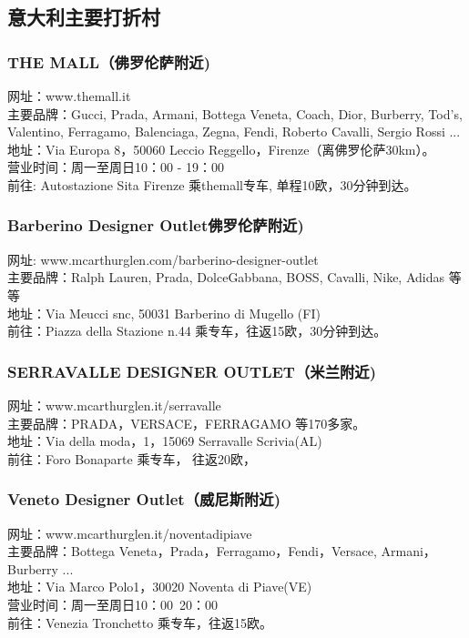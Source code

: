 \begin{itemize}
\begin{itemize}
\section{意大利主要打折村}
\begin{multicols}{2}

\subsubsection{THE MALL（佛罗伦萨附近)}
\noindent 网址：www.themall.it\\
主要品牌：Gucci, Prada, Armani, Bottega Veneta, Coach, Dior, Burberry, Tod’s, Valentino, Ferragamo, Balenciaga, Zegna, Fendi, Roberto Cavalli, Sergio Rossi ...\\
地址：Via Europa 8，50060 Leccio Reggello，Firenze（离佛罗伦萨30km）。\\
营业时间：周一至周日10：00 - 19：00 \\
前往: Autostazione Sita Firenze 乘themall专车, 单程10欧，30分钟到达。

\subsubsection{Barberino Designer Outlet佛罗伦萨附近)}
\noindent 网址: www.mcarthurglen.com/barberino-designer-outlet\\
主要品牌：Ralph Lauren, Prada, DolceGabbana, BOSS, Cavalli, Nike, Adidas 等等\\
地址：Via Meucci snc, 50031 Barberino di Mugello (FI)\\
前往：Piazza della Stazione n.44 乘专车，往返15欧，30分钟到达。
 
\subsubsection{SERRAVALLE DESIGNER OUTLET（米兰附近)}
\noindent 网址：www.mcarthurglen.it/serravalle\\
主要品牌：PRADA，VERSACE，FERRAGAMO 等170多家。\\
地址：Via della moda，1，15069 Serravalle Scrivia(AL)\\
前往：Foro Bonaparte 乘专车， 往返20欧，
 
\subsubsection{Veneto Designer Outlet（威尼斯附近)}
\noindent 网址：www.mcarthurglen.it/noventadipiave \\
主要品牌：Bottega Veneta，Prada，Ferragamo，Fendi，Versace, Armani，Burberry ... \\
地址：Via Marco Polo1，30020 Noventa di Piave(VE) \\
营业时间：周一至周日10：00~20：00\\
前往：Venezia Tronchetto 乘专车，往返15欧。
 

\end{multicols}
\end{itemize}
\end{itemize}
